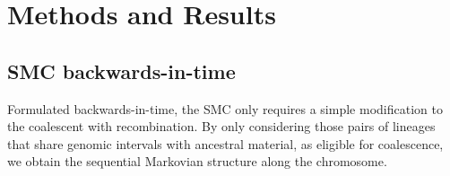 \documentclass{article}
\begin{document}








\section{Methods and Results}
\subsection{SMC backwards-in-time}\label{par:description}

Formulated backwards-in-time, the SMC \citep{mcvean_approximating_2005} only requires a 
simple modification to the 
coalescent with recombination. By only considering those pairs of 
lineages that share 
genomic intervals with ancestral material, as eligible for coalescence, we obtain the 
sequential Markovian structure along the chromosome.\\
\end{document}
